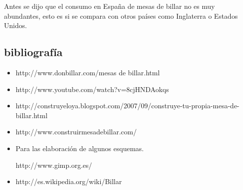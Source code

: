 Antes se dijo que el consumo en España de mesas de billar no es muy abundantes, esto es si se compara con otros países como Inglaterra o Estados Unidos.

\clearpage
\subsection{bibliografía}
\begin{itemize}

\item http://www.donbillar.com/mesas de billar.html
\item http://www.youtube.com/watch?v=8cjHNDAokqs
\item http://construyeloya.blogspot.com/2007/09/construye-tu-propia-mesa-de-billar.html
\item http://www.construirmesadebillar.com/
\item Para las elaboración de algunos esquemas.

 http://www.gimp.org.es/

\item http://es.wikipedia.org/wiki/Billar
\end{itemize}